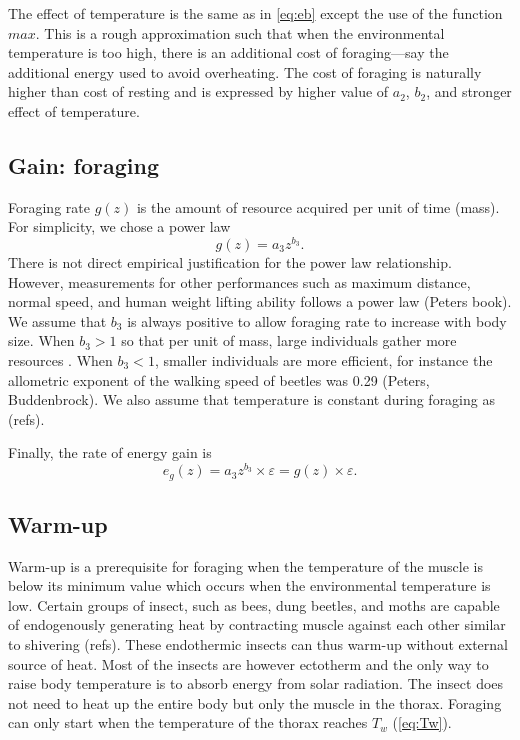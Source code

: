 The effect of temperature is the same as in \cref{eq:eb} except the use of the function $max$.
This is a rough approximation such that when the environmental temperature is too high, there is an additional cost of foraging---say the additional energy used to avoid overheating. 
The cost of foraging is naturally higher than cost of resting and is expressed by higher value of $a_2$, $b_2$, and stronger effect of temperature.

\subsection*{Gain: foraging}
Foraging rate $g(z)$ is the amount of resource acquired per unit of time (mass).
For simplicity, we chose a power law 
\[
	g(z) = a_3 z^{b_3}.
\] 
There is not direct empirical justification for the power law relationship.
However, measurements for other performances such as maximum distance, normal speed, and human weight lifting ability follows a power law (Peters book). 
We assume that $b_3$ is always positive to allow foraging rate to increase with body size.
When $b_3 > 1$ so that per unit of mass, large individuals gather more resources \citep[e.g.,][]{Nervo2014}.
When $b_3 < 1$, smaller individuals are more efficient, for instance the allometric exponent of the walking speed of beetles was 0.29 (Peters, Buddenbrock). 
We also assume that temperature is constant during foraging as (refs).

Finally, the rate of energy gain is  
\begin{equation} \label{eq:eg}
	e_g(z) = a_3 z^{b_3} \times \varepsilon  = g(z) \times \varepsilon.
\end{equation}

\subsection*{Warm-up}
Warm-up is a prerequisite for foraging when the temperature of the muscle is below its minimum value which occurs when the environmental temperature is low. 
Certain groups of insect, such as bees, dung beetles, and moths are capable of endogenously generating heat by contracting muscle against each other similar to shivering (refs).
These endothermic insects can thus warm-up without external source of heat. 
Most of the insects are however ectotherm and the only way to raise body temperature is to absorb energy from solar radiation.
The insect does not need to heat up the entire body but only the muscle in the thorax.
Foraging can only start when the temperature of the thorax reaches $T_w$ (\cref{eq:Tw}).

